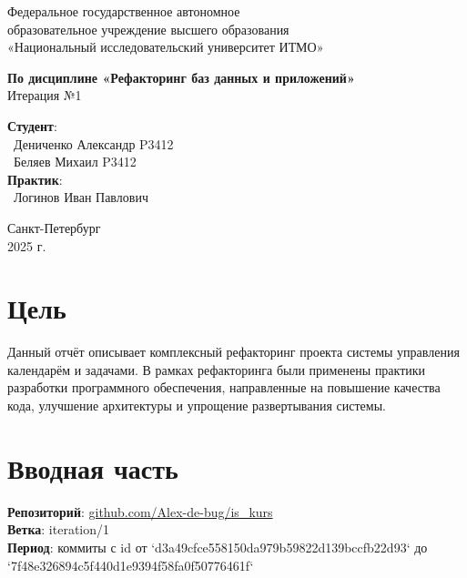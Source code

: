 \documentclass{article}
\begin{document}
\begin{center}
    \Large
    Федеральное государственное автономное \\
    образовательное учреждение высшего образования \\ 
    «Национальный исследовательский университет ИТМО»\\
    \vspace{0.5cm}
    \large
    
    \vspace{1cm}
    \Large
    \textbf{По дисциплине «Рефакторинг баз данных и приложений»} \\
        Итерация №1\\
    \large
    \vspace{8cm}

    \begin{minipage}{.33\textwidth}
    \end{minipage}
    \hfill
    \begin{minipage}{.4\textwidth}
    
        \textbf{Студент}: \vspace{.1cm} \\
        \ Дениченко Александр P3412\\
        \ Беляев Михаил P3412\\
        \textbf{Практик}:  \\
        \ Логинов Иван Павлович
    \end{minipage}
    \vfill
Санкт-Петербург\\ 2025 г.
\end{center}
\pagestyle{empty}
\newpage
\pagestyle{plain}

\section*{Цель}
Данный отчёт описывает комплексный рефакторинг проекта системы управления календарём и задачами. В рамках рефакторинга были применены практики разработки программного обеспечения, направленные на повышение качества кода, улучшение архитектуры и упрощение развертывания системы.

\section{Вводная часть}
\textbf{Репозиторий}: \href{https://github.com/Alex-de-bug/is_kurs/tree/iteration/1}{github.com/Alex-de-bug/is\_kurs}
\\
\textbf{Ветка}: iteration/1
\\
\textbf{Период}: коммиты с id от `d3a49cfce558150da979b59822d139bccfb22d93` до `7f48e326894c5f440d1e9394f58fa0f50776461f`
\end{document}
